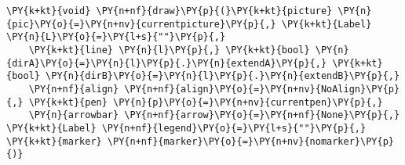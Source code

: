 \begin{Verbatim}[commandchars=\\\{\}]
    \PY{k+kt}{void} \PY{n+nf}{draw}\PY{p}{(}\PY{k+kt}{picture} \PY{n}{pic}\PY{o}{=}\PY{n+nv}{currentpicture}\PY{p}{,} \PY{k+kt}{Label} \PY{n}{L}\PY{o}{=}\PY{l+s}{""}\PY{p}{,}
    \PY{k+kt}{line} \PY{n}{l}\PY{p}{,} \PY{k+kt}{bool} \PY{n}{dirA}\PY{o}{=}\PY{n}{l}\PY{p}{.}\PY{n}{extendA}\PY{p}{,} \PY{k+kt}{bool} \PY{n}{dirB}\PY{o}{=}\PY{n}{l}\PY{p}{.}\PY{n}{extendB}\PY{p}{,}
    \PY{n+nf}{align} \PY{n+nf}{align}\PY{o}{=}\PY{n+nv}{NoAlign}\PY{p}{,} \PY{k+kt}{pen} \PY{n}{p}\PY{o}{=}\PY{n+nv}{currentpen}\PY{p}{,}
    \PY{n}{arrowbar} \PY{n+nf}{arrow}\PY{o}{=}\PY{n+nf}{None}\PY{p}{,} \PY{k+kt}{Label} \PY{n+nf}{legend}\PY{o}{=}\PY{l+s}{""}\PY{p}{,} \PY{k+kt}{marker} \PY{n+nf}{marker}\PY{o}{=}\PY{n+nv}{nomarker}\PY{p}{)}
\end{Verbatim}

